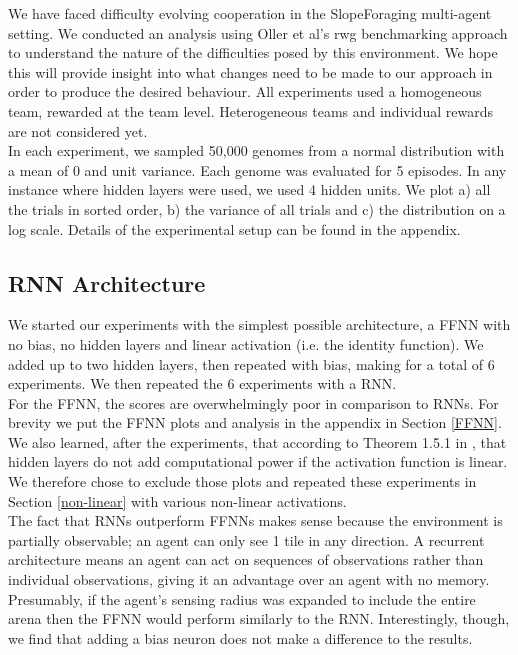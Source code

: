 \documentclass[12pt]{article}
\begin{document}
We have faced difficulty evolving cooperation in the SlopeForaging multi-agent setting. We conducted an analysis using Oller et al's rwg benchmarking approach \cite{oller:AAMAS:2020} to understand the nature of the difficulties posed by this environment. We hope this will provide insight into what changes need to be made to our approach in order to produce the desired behaviour. All experiments used a homogeneous team, rewarded at the team level. Heterogeneous teams and individual rewards are not considered yet.\\

In each experiment, we sampled 50,000 genomes from a normal distribution with a mean of 0 and unit variance. Each genome was evaluated for 5 episodes. In any instance where hidden layers were used, we used 4 hidden units. We plot a) all the trials in sorted order, b) the variance of all trials and c) the distribution on a log scale. Details of the experimental setup can be found in the appendix.
		
\subsection{RNN Architecture} \label{RNN Architecture}

We started our experiments with the simplest possible architecture, a FFNN with no bias, no hidden layers and linear activation (i.e. the identity function). We added up to two hidden layers, then repeated with bias, making for a total of 6 experiments. We then repeated the 6 experiments with a RNN. \\

For the FFNN, the scores are overwhelmingly poor in comparison to RNNs. For brevity we put the FFNN plots and analysis in the appendix in Section \ref{FFNN}. We also learned, after the experiments, that according to Theorem 1.5.1 in \cite{aggarwal:Springer:2018}, that hidden layers do not add computational power if the activation function is linear. We therefore chose to exclude those plots and repeated these experiments in Section \ref{non-linear} with various non-linear activations.\\

The fact that RNNs outperform FFNNs makes sense because the environment is partially observable; an agent can only see 1 tile in any direction. A recurrent architecture means an agent can act on sequences of observations rather than individual observations, giving it an advantage over an agent with no memory. Presumably, if the agent's sensing radius was expanded to include the entire arena then the FFNN would perform similarly to the RNN. Interestingly, though, we find that adding a bias neuron does not make a difference to the results.\\ 
\end{document}
